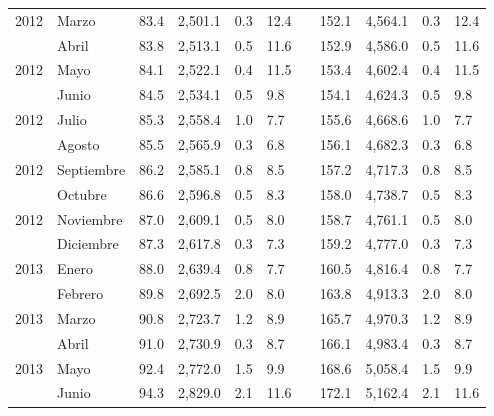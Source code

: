 \begin{center}
\begin{longtable}{llp{1.1cm}p{1.2cm}p{1.2cm}p{1.2cm}rp{1.2cm}p{1.2cm}p{1.2cm}p{1.2cm}}
		\multicolumn{1}{l}{	2012	}&	Marzo	&	 83.4 	&	 2,501.1 	&	 0.3 	&	 12.4 	&  &	 152.1 	&	 4,564.1 	&	 0.3 	&	 12.4 	\\
		\rowcolor{color1!5!white}\multicolumn{1}{l}{	2012	}&	Abril	&	 83.8 	&	 2,513.1 	&	 0.5 	&	 11.6 	&  &	 152.9 	&	 4,586.0 	&	 0.5 	&	 11.6 	\\
		\multicolumn{1}{l}{	2012	}&	Mayo	&	 84.1 	&	 2,522.1 	&	 0.4 	&	 11.5 	&  &	 153.4 	&	 4,602.4 	&	 0.4 	&	 11.5 	\\
		\rowcolor{color1!5!white}\multicolumn{1}{l}{	2012	}&	Junio	&	 84.5 	&	 2,534.1 	&	 0.5 	&	 9.8 	&  &	 154.1 	&	 4,624.3 	&	 0.5 	&	 9.8 	\\
		\multicolumn{1}{l}{	2012	}&	Julio	&	 85.3 	&	 2,558.4 	&	 1.0 	&	 7.7 	&  &	 155.6 	&	 4,668.6 	&	 1.0 	&	 7.7 	\\
		\rowcolor{color1!5!white}\multicolumn{1}{l}{	2012	}&	Agosto	&	 85.5 	&	 2,565.9 	&	 0.3 	&	 6.8 	&  &	 156.1 	&	 4,682.3 	&	 0.3 	&	 6.8 	\\
		\multicolumn{1}{l}{	2012	}&	Septiembre	&	 86.2 	&	 2,585.1 	&	 0.8 	&	 8.5 	&  &	 157.2 	&	 4,717.3 	&	 0.8 	&	 8.5 	\\
		\rowcolor{color1!5!white}\multicolumn{1}{l}{	2012	}&	Octubre	&	 86.6 	&	 2,596.8 	&	 0.5 	&	 8.3 	&  &	 158.0 	&	 4,738.7 	&	 0.5 	&	 8.3 	\\
		\multicolumn{1}{l}{	2012	}&	Noviembre	&	 87.0 	&	 2,609.1 	&	 0.5 	&	 8.0 	&  &	 158.7 	&	 4,761.1 	&	 0.5 	&	 8.0 	\\
		\rowcolor{color1!5!white}\multicolumn{1}{l}{	2012	}&	Diciembre	&	 87.3 	&	 2,617.8 	&	 0.3 	&	 7.3 	&  &	 159.2 	&	 4,777.0 	&	 0.3 	&	 7.3 	\\
		\multicolumn{1}{l}{	2013	}&	Enero	&	 88.0 	&	 2,639.4 	&	 0.8 	&	 7.7 	&  &	 160.5 	&	 4,816.4 	&	 0.8 	&	 7.7 	\\
		\rowcolor{color1!5!white}\multicolumn{1}{l}{	2013	}&	Febrero	&	 89.8 	&	 2,692.5 	&	 2.0 	&	 8.0 	&  &	 163.8 	&	 4,913.3 	&	 2.0 	&	 8.0 	\\
		\multicolumn{1}{l}{	2013	}&	Marzo	&	 90.8 	&	 2,723.7 	&	 1.2 	&	 8.9 	&  &	 165.7 	&	 4,970.3 	&	 1.2 	&	 8.9 	\\
		\rowcolor{color1!5!white}\multicolumn{1}{l}{	2013	}&	Abril	&	 91.0 	&	 2,730.9 	&	 0.3 	&	 8.7 	&  &	 166.1 	&	 4,983.4 	&	 0.3 	&	 8.7 	\\
		\multicolumn{1}{l}{	2013	}&	Mayo	&	 92.4 	&	 2,772.0 	&	 1.5 	&	 9.9 	&  &	 168.6 	&	 5,058.4 	&	 1.5 	&	 9.9 	\\
		\rowcolor{color1!5!white}\multicolumn{1}{l}{	2013	}&	Junio	&	 94.3 	&	 2,829.0 	&	 2.1 	&	 11.6 	&  &	 172.1 	&	 5,162.4 	&	 2.1 	&	 11.6 	\\

\end{longtable}
\end{center}

